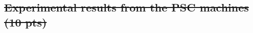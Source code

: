 \documentclass[letterpaper,11pt]{exam}
\begin{document}
\begin{questions}
    \question
    \subsection*{\sout{Experimental results from the PSC machines (10 pts)}}








\end{questions}
\end{document}
